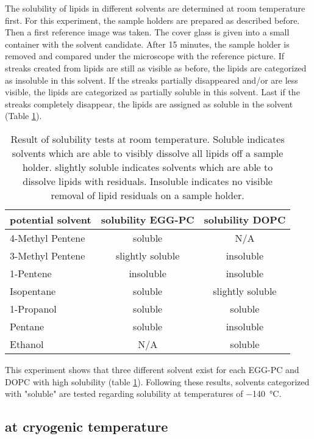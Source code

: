 The solubility of lipids in different solvents are determined at room temperature first. For this experiment, the sample holders are prepared as described before. Then a first reference image was taken. The cover glass is given into a small container with the solvent candidate. After 15 minutes, the sample holder is removed and compared under the microscope with the reference picture. If streaks created from lipids are still as visible as before, the lipids are categorized as insoluble in this solvent. If the streaks partially disappeared and/or are less visible, the lipids are categorized as partially soluble in this solvent. Last if the streaks completely disappear, the lipids are assigned as soluble in the solvent (Table \ref{table:LoeslichkeitRaumtemperatur}).


\begin{table}[hbt!]
	\centering
	\begin{tabular}{|l|c|c|}
		\hline
		potential solvent & solubility EGG-PC & solubility DOPC \\
		\hline
		\hline
		4-Methyl Pentene & soluble & N/A  \\ 
		\hline
		3-Methyl Pentene & slightly soluble & insoluble \\
		\hline
		1-Pentene & insoluble & insoluble \\
		\hline
		Isopentane & soluble & slightly soluble\\
		\hline
		1-Propanol & soluble & soluble\\
		\hline
		Pentane & soluble & insoluble\\
		\hline
		Ethanol & N/A & soluble\\
		\hline
	\end{tabular}
	\caption{Result of solubility tests at room temperature. Soluble indicates solvents which are able to visibly dissolve all lipids off a sample holder. slightly soluble indicates solvents which are able to dissolve lipids with residuals. Insoluble indicates no visible removal of lipid residuals on a sample holder.}
	\label{table:LoeslichkeitRaumtemperatur}
\end{table}

This experiment shows that three different solvent exist for each EGG-PC and DOPC with high solubility (table \ref{table:LoeslichkeitRaumtemperatur}). Following these results, solvents categorized with "soluble" are tested regarding solubility at temperatures of \SI{-140}{\degreeCelsius}. 

\FloatBarrier
\subsection{at cryogenic temperature}

